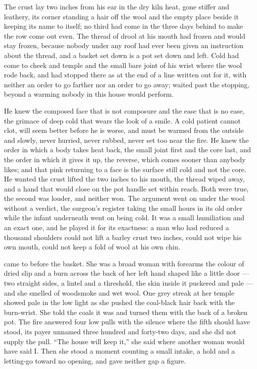 The crust lay two inches from his ear in the dry kiln heat, gone stiffer and leathery, its corner standing a hair off the wool and the empty place beside it keeping its name to itself; no third had come in the three days behind to make the row come out even. The thread of drool at his mouth had frozen and would stay frozen, because nobody under any roof had ever been given an instruction about the thread, and a basket set down is a pot set down and left. Cold had come to cheek and temple and the small bare joint of his wrist where the wool rode back, and had stopped there as at the end of a line written out for it, with neither an order to go farther nor an order to go away;  waited past the stopping, beyond a warming nobody in this house would perform.

He knew the composed face that is not composure and the ease that is no ease, the grimace of deep cold that wears the look of a smile. A cold patient cannot clot, will seem better before he is worse, and must be warmed from the outside and slowly, never hurried, never rubbed, never set too near the fire. He knew the order in which a body takes heat back, the small joint first and the core last, and the order in which it gives it up, the reverse, which comes sooner than anybody likes; and that pink returning to a face is the surface still cold and not the core. He wanted the crust lifted the two inches to his mouth, the thread wiped away, and a hand that would close on the pot handle set within reach. Both were true, the second was louder, and neither won. The argument went on under the wool without a verdict, the surgeon's register taking the small hours in its old order while the infant underneath went on being cold. It was a small humiliation and an exact one, and he played it for its exactness: a man who had reduced a thousand shoulders could not lift a barley crust two inches, could not wipe his own mouth, could not keep a fold of wool at his own chin.

\scenebreak

 came to  before the basket. She was a broad woman with forearms the colour of dried slip and a burn across the back of her left hand shaped like a little door --- two straight sides, a lintel and a threshold, the skin inside it puckered and pale --- and she smelled of woodsmoke and wet wool. One grey streak at her temple showed pale in the low light as she pushed the coal-black hair back with the burn-wrist. She told the coals it was  and turned them with the back of a broken pot. The fire answered four low pulls with the silence where the fifth should have stood, its payer unnamed three hundred and forty-two days, and she did not supply the pull. “The house will keep it,” she said where another woman would have said I. Then she stood a moment counting a small intake, a hold and a letting-go toward no opening, and gave neither gap a figure.

